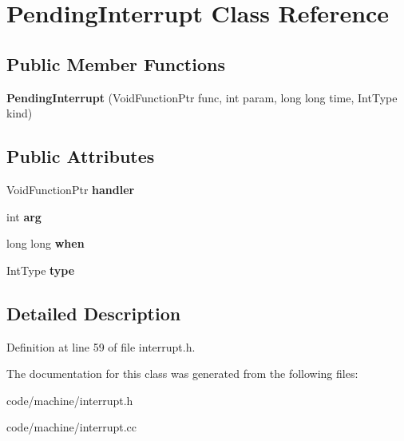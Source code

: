 \section{Pending\+Interrupt Class Reference}
\label{class_pending_interrupt}
\subsection*{Public Member Functions}
\begin{DoxyCompactItemize}
\item 
{\bfseries Pending\+Interrupt} (Void\+Function\+Ptr func, int param, long long time, Int\+Type kind)\label{class_pending_interrupt_adcb5308d9a24cac163a73254e3da76cb}

\end{DoxyCompactItemize}
\subsection*{Public Attributes}
\begin{DoxyCompactItemize}
\item 
Void\+Function\+Ptr {\bfseries handler}\label{class_pending_interrupt_a4e39241c89b2e3040286333e9f83ea7d}

\item 
int {\bfseries arg}\label{class_pending_interrupt_a6484e4d50ddf69562125af75f31bda5d}

\item 
long long {\bfseries when}\label{class_pending_interrupt_a182f9d9179ea53547d19e96a2312f10a}

\item 
Int\+Type {\bfseries type}\label{class_pending_interrupt_a1ffee584e6fd0f25be17d01c4f5a5151}

\end{DoxyCompactItemize}


\subsection{Detailed Description}


Definition at line 59 of file interrupt.\+h.



The documentation for this class was generated from the following files\+:\begin{DoxyCompactItemize}
\item 
code/machine/interrupt.\+h\item 
code/machine/interrupt.\+cc\end{DoxyCompactItemize}
